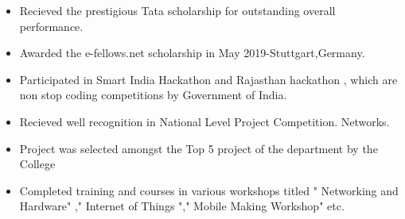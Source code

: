 \begin{itemize}
    \item Recieved the prestigious Tata scholarship for outstanding overall performance.
    \item Awarded the e-fellows.net scholarship in May 2019-Stuttgart,Germany.
    \item Participated in Smart India Hackathon and Rajasthan hackathon , which are non stop coding competitions by Government of India.
    \item Recieved well recognition in National Level Project  Competition. Networks.
    \item  Project was selected amongst the Top 5 project of the department by the College
    \item Completed training and courses in various workshops titled " Networking and Hardware" ," Internet of Things "," Mobile Making Workshop" etc.
    
\end{itemize}


\dividers